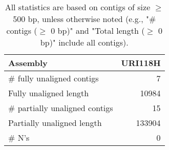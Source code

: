 \documentclass[12pt,a4paper]{article}
\begin{document}
\begin{table}[ht]
\begin{center}
\caption{All statistics are based on contigs of size $\geq$ 500 bp, unless otherwise noted (e.g., "\# contigs ($\geq$ 0 bp)" and "Total length ($\geq$ 0 bp)" include all contigs).}
\begin{tabular}{|l*{1}{|r}|}
\hline
Assembly & URI118H \\ \hline
\# fully unaligned contigs & 7 \\ \hline
Fully unaligned length & 10984 \\ \hline
\# partially unaligned contigs & 15 \\ \hline
Partially unaligned length & 133904 \\ \hline
\# N's & 0 \\ \hline
\end{tabular}
\end{center}
\end{table}
\end{document}
